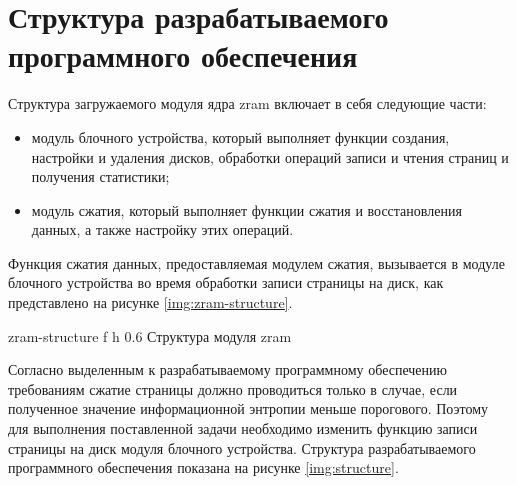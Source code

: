 \section{Структура разрабатываемого программного обеспечения}

Структура загружаемого модуля ядра zram включает в себя следующие части:
\begin{itemize}
	\item модуль блочного устройства, который выполняет функции создания, настройки и удаления дисков, обработки операций записи и чтения страниц и получения статистики;
	\item модуль сжатия, который выполняет функции сжатия и восстановления данных, а также настройку этих операций.
\end{itemize}

Функция сжатия данных, предоставляемая модулем сжатия, вызывается в модуле блочного устройства во время обработки записи страницы на диск, как представлено на рисунке \ref{img:zram-structure}.

    {zram-structure}
    {f}
    {h}
    {0.6\textwidth}
    {Структура модуля zram}

Согласно выделенным к разрабатываемому программному обеспечению требованиям сжатие страницы должно проводиться только в случае, если полученное значение информационной энтропии меньше порогового. Поэтому для выполнения поставленной задачи необходимо изменить функцию записи страницы на диск модуля блочного устройства. Структура разрабатываемого программного обеспечения показана на рисунке \ref{img:structure}.

